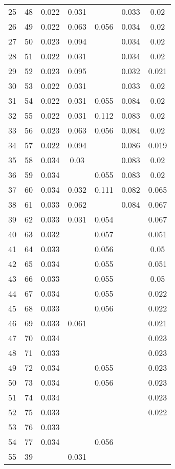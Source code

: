 \begin{longtable}{lp{7cm}ccccc}
  25 & 48 & 0.022 & 0.031 &  & 0.033 & 0.02 \\ 
  26 & 49 & 0.022 & 0.063 & 0.056 & 0.034 & 0.02 \\ 
  27 & 50 & 0.023 & 0.094 &  & 0.034 & 0.02 \\ 
  28 & 51 & 0.022 & 0.031 &  & 0.034 & 0.02 \\ 
  29 & 52 & 0.023 & 0.095 &  & 0.032 & 0.021 \\ 
  30 & 53 & 0.022 & 0.031 &  & 0.033 & 0.02 \\ 
  31 & 54 & 0.022 & 0.031 & 0.055 & 0.084 & 0.02 \\ 
  32 & 55 & 0.022 & 0.031 & 0.112 & 0.083 & 0.02 \\ 
  33 & 56 & 0.023 & 0.063 & 0.056 & 0.084 & 0.02 \\ 
  34 & 57 & 0.022 & 0.094 &  & 0.086 & 0.019 \\ 
  35 & 58 & 0.034 & 0.03 &  & 0.083 & 0.02 \\ 
  36 & 59 & 0.034 &  & 0.055 & 0.083 & 0.02 \\ 
  37 & 60 & 0.034 & 0.032 & 0.111 & 0.082 & 0.065 \\ 
  38 & 61 & 0.033 & 0.062 &  & 0.084 & 0.067 \\ 
  39 & 62 & 0.033 & 0.031 & 0.054 &  & 0.067 \\ 
  40 & 63 & 0.032 &  & 0.057 &  & 0.051 \\ 
  41 & 64 & 0.033 &  & 0.056 &  & 0.05 \\ 
  42 & 65 & 0.034 &  & 0.055 &  & 0.051 \\ 
  43 & 66 & 0.033 &  & 0.055 &  & 0.05 \\ 
  44 & 67 & 0.034 &  & 0.055 &  & 0.022 \\ 
  45 & 68 & 0.033 &  & 0.056 &  & 0.022 \\ 
  46 & 69 & 0.033 & 0.061 &  &  & 0.021 \\ 
  47 & 70 & 0.034 &  &  &  & 0.023 \\ 
  48 & 71 & 0.033 &  &  &  & 0.023 \\ 
  49 & 72 & 0.034 &  & 0.055 &  & 0.023 \\ 
  50 & 73 & 0.034 &  & 0.056 &  & 0.023 \\ 
  51 & 74 & 0.034 &  &  &  & 0.023 \\ 
  52 & 75 & 0.033 &  &  &  & 0.022 \\ 
  53 & 76 & 0.033 &  &  &  &  \\ 
  54 & 77 & 0.034 &  & 0.056 &  &  \\ 
  55 & 39 &  & 0.031 &  &  &  \\ 

\end{longtable}
